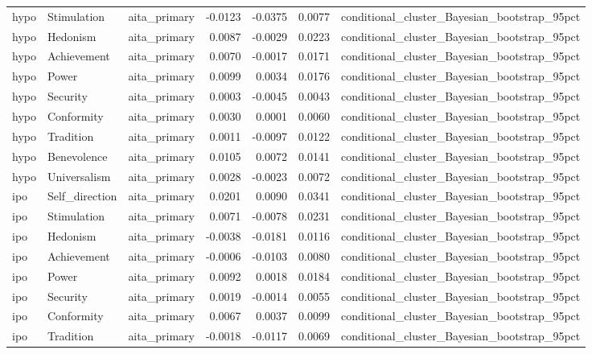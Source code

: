 \begin{tabular}{lllrrrl}
hypo & Stimulation & aita\_primary & -0.0123 & -0.0375 & 0.0077 & conditional\_cluster\_Bayesian\_bootstrap\_95pct \\
hypo & Hedonism & aita\_primary & 0.0087 & -0.0029 & 0.0223 & conditional\_cluster\_Bayesian\_bootstrap\_95pct \\
hypo & Achievement & aita\_primary & 0.0070 & -0.0017 & 0.0171 & conditional\_cluster\_Bayesian\_bootstrap\_95pct \\
hypo & Power & aita\_primary & 0.0099 & 0.0034 & 0.0176 & conditional\_cluster\_Bayesian\_bootstrap\_95pct \\
hypo & Security & aita\_primary & 0.0003 & -0.0045 & 0.0043 & conditional\_cluster\_Bayesian\_bootstrap\_95pct \\
hypo & Conformity & aita\_primary & 0.0030 & 0.0001 & 0.0060 & conditional\_cluster\_Bayesian\_bootstrap\_95pct \\
hypo & Tradition & aita\_primary & 0.0011 & -0.0097 & 0.0122 & conditional\_cluster\_Bayesian\_bootstrap\_95pct \\
hypo & Benevolence & aita\_primary & 0.0105 & 0.0072 & 0.0141 & conditional\_cluster\_Bayesian\_bootstrap\_95pct \\
hypo & Universalism & aita\_primary & 0.0028 & -0.0023 & 0.0072 & conditional\_cluster\_Bayesian\_bootstrap\_95pct \\
ipo & Self\_direction & aita\_primary & 0.0201 & 0.0090 & 0.0341 & conditional\_cluster\_Bayesian\_bootstrap\_95pct \\
ipo & Stimulation & aita\_primary & 0.0071 & -0.0078 & 0.0231 & conditional\_cluster\_Bayesian\_bootstrap\_95pct \\
ipo & Hedonism & aita\_primary & -0.0038 & -0.0181 & 0.0116 & conditional\_cluster\_Bayesian\_bootstrap\_95pct \\
ipo & Achievement & aita\_primary & -0.0006 & -0.0103 & 0.0080 & conditional\_cluster\_Bayesian\_bootstrap\_95pct \\
ipo & Power & aita\_primary & 0.0092 & 0.0018 & 0.0184 & conditional\_cluster\_Bayesian\_bootstrap\_95pct \\
ipo & Security & aita\_primary & 0.0019 & -0.0014 & 0.0055 & conditional\_cluster\_Bayesian\_bootstrap\_95pct \\
ipo & Conformity & aita\_primary & 0.0067 & 0.0037 & 0.0099 & conditional\_cluster\_Bayesian\_bootstrap\_95pct \\
ipo & Tradition & aita\_primary & -0.0018 & -0.0117 & 0.0069 & conditional\_cluster\_Bayesian\_bootstrap\_95pct \\

\end{tabular}
